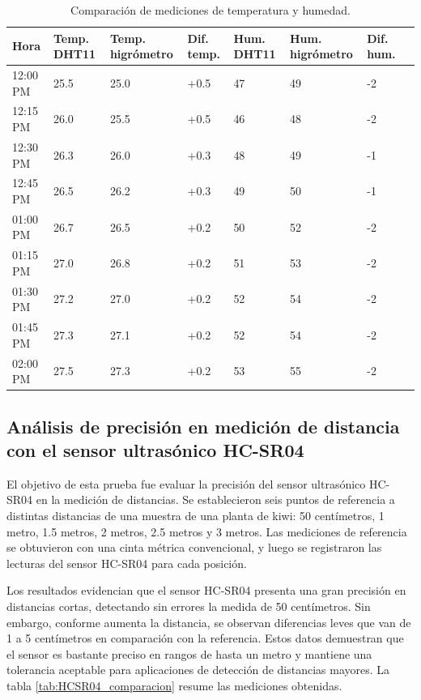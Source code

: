 \begin{table}[h]
    \centering
    \caption[Comparación de mediciones de temperatura y humedad]{Comparación de mediciones de temperatura y humedad.}
    \begin{tabularx}{\textwidth}{l X X X X X X X}  %
        \toprule
        \textbf{Hora} & \textbf{Temp. DHT11} & \textbf{Temp. higrómetro} & \textbf{Dif. temp.} & \textbf{Hum. DHT11} & \textbf{Hum. higrómetro} & \textbf{Dif. hum.} \\
        \midrule
        12:00 PM & 25.5 & 25.0 & +0.5 & 47 & 49 & -2\\		
        12:15 PM & 26.0 & 25.5 & +0.5 & 46 & 48	& -2\\
        12:30 PM & 26.3 & 26.0 & +0.3 & 48 & 49 & -1\\
        12:45 PM & 26.5 & 26.2 & +0.3 & 49 & 50 & -1\\
        01:00 PM & 26.7 & 26.5 & +0.2 & 50 & 52 & -2\\
        01:15 PM & 27.0 & 26.8 & +0.2 & 51 & 53 & -2\\
        01:30 PM & 27.2 & 27.0 & +0.2 & 52 & 54 & -2\\
        01:45 PM & 27.3 & 27.1 & +0.2 & 52 & 54 & -2\\
        02:00 PM & 27.5 & 27.3 & +0.2 & 53 & 55 & -2\\
        \bottomrule
    \end{tabularx}
    \label{tab:DHT11_comparacion}
\end{table}

\subsection{Análisis de precisión en medición de distancia con el sensor ultrasónico HC-SR04}

El objetivo de esta prueba fue evaluar la precisión del sensor ultrasónico HC-SR04 en la medición de distancias. Se establecieron seis puntos de referencia a distintas distancias de una muestra de una planta de kiwi: 50 centímetros, 1 metro, 1.5 metros, 2 metros, 2.5 metros y 3 metros. Las mediciones de referencia se obtuvieron con una cinta métrica convencional, y luego se registraron las lecturas del sensor HC-SR04 para cada posición.

Los resultados evidencian que el sensor HC-SR04 presenta una gran precisión en distancias cortas, detectando sin errores la medida de 50 centímetros. Sin embargo, conforme aumenta la distancia, se observan diferencias leves que van de 1 a 5 centímetros en comparación con la referencia. Estos datos demuestran que el sensor es bastante preciso en rangos de hasta un metro y mantiene una tolerancia aceptable para aplicaciones de detección de distancias mayores. La tabla \ref{tab:HCSR04_comparacion} resume las mediciones obtenidas.

